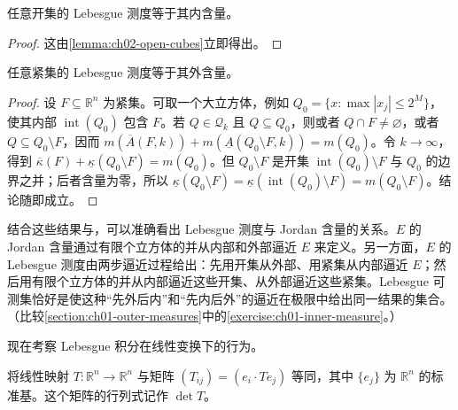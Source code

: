 \documentclass[../../main.tex]{subfiles}%
\begin{document}
\begin{proposition}\label{proposition:ch02-open-inner-content}
任意开集的 Lebesgue 测度等于其内含量。
\end{proposition}
\begin{proof}
这由\cref{lemma:ch02-open-cubes}立即得出。
\end{proof}
\begin{proposition}\label{proposition:ch02-compact-outer-content}
任意紧集的 Lebesgue 测度等于其外含量。
\end{proposition}
\begin{proof}
设 $F\subseteq\mathbb{R}^n$ 为紧集。可取一个大立方体，例如 $Q_0=\{x:\max|x_j|\le2^M\}$，使其内部 $\operatorname{int}(Q_0)$ 包含 $F$。若 $Q\in\mathscr{Q}_k$ 且 $Q\subseteq Q_0$，则或者 $Q\cap F\ne\varnothing$，或者 $Q\subseteq Q_0\setminus F$，因而 $m(\overline{A}(F,k))+m(\underline{A}(Q_0\setminus F,k))=m(Q_0)$。令 $k\to\infty$，得到 $\overline{\kappa}(F)+\underline{\kappa}(Q_0\setminus F)=m(Q_0)$。但 $Q_0\setminus F$ 是开集 $\operatorname{int}(Q_0)\setminus F$ 与 $Q_0$ 的边界之并；后者含量为零，所以 $\underline{\kappa}(Q_0\setminus F)=\underline{\kappa}(\operatorname{int}(Q_0)\setminus F)=m(Q_0\setminus F)$。结论随即成立。
\end{proof}
\begin{remark}
结合这些结果与，可以准确看出 Lebesgue 测度与 Jordan 含量的关系。$E$ 的 Jordan 含量通过有限个立方体的并从内部和外部逼近 $E$ 来定义。另一方面，$E$ 的 Lebesgue 测度由两步逼近过程给出：先用开集从外部、用紧集从内部逼近 $E$；然后用有限个立方体的并从内部逼近这些开集、从外部逼近这些紧集。Lebesgue 可测集恰好是使这种“先外后内”和“先内后外”的逼近在极限中给出同一结果的集合。（比较\cref{section:ch01-outer-measures}中的\cref{exercise:ch01-inner-measure}。）
\end{remark}
现在考察 Lebesgue 积分在线性变换下的行为。
\begin{definition}[线性映射的矩阵与行列式]\label{definition:ch02-linear-map-matrix}
将线性映射 $T:\mathbb{R}^n\to\mathbb{R}^n$ 与矩阵 $(T_{ij})=(e_i\cdot Te_j)$ 等同，其中 $\{e_j\}$ 为 $\mathbb{R}^n$ 的标准基。这个矩阵的行列式记作 $\det T$。
\end{definition}
\end{document}
